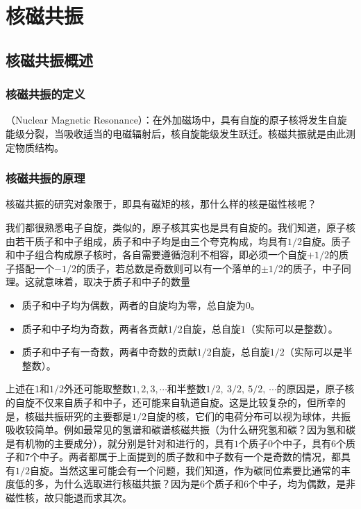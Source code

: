\chapter{核磁共振}

\section{核磁共振概述}

\subsection{核磁共振的定义}
（Nuclear Magnetic Resonance）：在外加磁场中，具有自旋的原子核将发生自旋能级分裂，当吸收适当的电磁辐射后，核自旋能级发生跃迁。核磁共振就是由此测定物质结构。

\subsection{核磁共振的原理}
核磁共振的研究对象限于，即具有磁矩的核，那什么样的核是磁性核呢？

我们都很熟悉电子自旋，类似的，原子核其实也是具有自旋的。我们知道，原子核由若干质子和中子组成，质子和中子均是由三个夸克构成，均具有$1/2$自旋。质子和中子组合构成原子核时，各自需要遵循泡利不相容，即必须一个自旋$+1/2$的质子搭配一个$-1/2$的质子，若总数是奇数则可以有一个落单的$\pm 1/2$的质子，中子同理。这就意味着，取决于质子和中子的数量
\begin{itemize}
    \item 质子和中子均为偶数，两者的自旋均为零，总自旋为$0$。
    \item 质子和中子均为奇数，两者各贡献$1/2$自旋，总自旋$1$（实际可以是整数）。
    \item 质子和中子有一奇数，两者中奇数的贡献$1/2$自旋，总自旋$1/2$（实际可以是半整数）。
\end{itemize}
上述在$1$和$1/2$外还可能取整数$1,2,3,\cdots$和半整数$1/2,\ 3/2,\ 5/2,\ \cdots $的原因是，原子核的自旋不仅来自质子和中子，还可能来自轨道自旋。这是比较复杂的，但所幸的是，核磁共振研究的主要都是$1/2$自旋的核，它们的电荷分布可以视为球体，共振吸收较简单。例如最常见的氢谱和碳谱核磁共振（为什么研究氢和碳？因为氢和碳是有机物的主要成分），就分别是针对和进行的，具有$1$个质子$0$个中子，具有$6$个质子和$7$个中子。两者都属于上面提到的质子数和中子数有一个是奇数的情况，都具有$1/2$自旋。当然这里可能会有一个问题，我们知道，作为碳同位素要比通常的丰度低的多，为什么选取进行核磁共振？因为是$6$个质子和$6$个中子，均为偶数，是非磁性核，故只能退而求其次。\goodbreak

